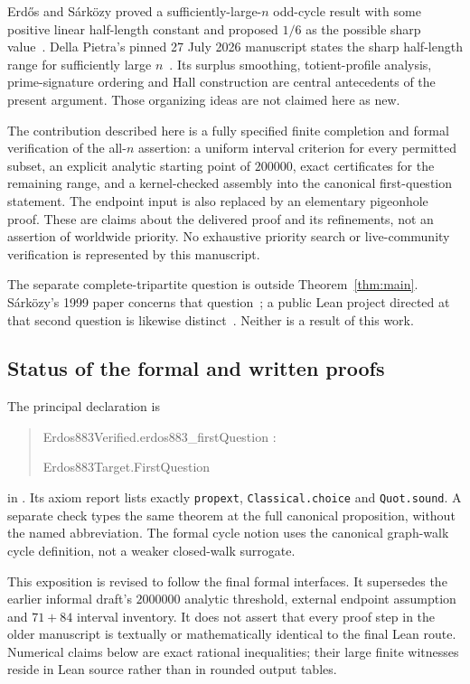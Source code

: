 \documentclass[11pt,letterpaper]{article}
\numberwithin{equation}{section}
\newcommand{\code}[1]{\texttt{#1}}
\begin{document}
Erdős and Sárközy proved a sufficiently-large-$n$ odd-cycle result with some positive linear half-length constant and proposed $1/6$ as the possible sharp value~\cite{ES97}. Della Pietra's pinned 27 July 2026 manuscript states the sharp half-length range for sufficiently large $n$~\cite{DP26}. Its surplus smoothing, totient-profile analysis, prime-signature ordering and Hall construction are central antecedents of the present argument. Those organizing ideas are not claimed here as new.

The contribution described here is a fully specified finite completion and formal verification of the all-$n$ assertion: a uniform interval criterion for every permitted subset, an explicit analytic starting point of $200000$, exact certificates for the remaining range, and a kernel-checked assembly into the canonical first-question statement. The endpoint input is also replaced by an elementary pigeonhole proof. These are claims about the delivered proof and its refinements, not an assertion of worldwide priority. No exhaustive priority search or live-community verification is represented by this manuscript.

The separate complete-tripartite question is outside Theorem~\ref{thm:main}. Sárközy's 1999 paper concerns that question~\cite{S99}; a public Lean project directed at that second question is likewise distinct~\cite{SecondLean}. Neither is a result of this work.

\subsection{Status of the formal and written proofs}
The principal declaration is
\begin{quote}\small\ttfamily
Erdos883Verified.erdos883\_firstQuestion :\par
Erdos883Target.FirstQuestion
\end{quote}
in . Its axiom report lists exactly \code{propext}, \code{Classical.choice} and \code{Quot.sound}. A separate check types the same theorem at the full canonical proposition, without the named abbreviation. The formal cycle notion uses the canonical graph-walk cycle definition, not a weaker closed-walk surrogate.

This exposition is revised to follow the final formal interfaces. It supersedes the earlier informal draft's $2000000$ analytic threshold, external endpoint assumption and $71+84$ interval inventory. It does not assert that every proof step in the older manuscript is textually or mathematically identical to the final Lean route. Numerical claims below are exact rational inequalities; their large finite witnesses reside in Lean source rather than in rounded output tables.
\end{document}
